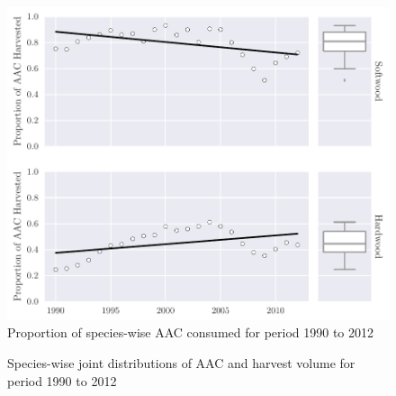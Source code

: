 \begin{figure}[h]
  \centering
  \includegraphics[width=\textwidth]{images/aac_consumption}
  \caption{Proportion of species-wise AAC consumed for period 1990 to 2012}
  \label{fig:aac_consumption}
\end{figure}

\begin{figure}[t]
    \centering
  \caption{Species-wise joint distributions of AAC and harvest volume for period 1990 to 2012}
  \label{fig:jointdist}
\end{figure}

